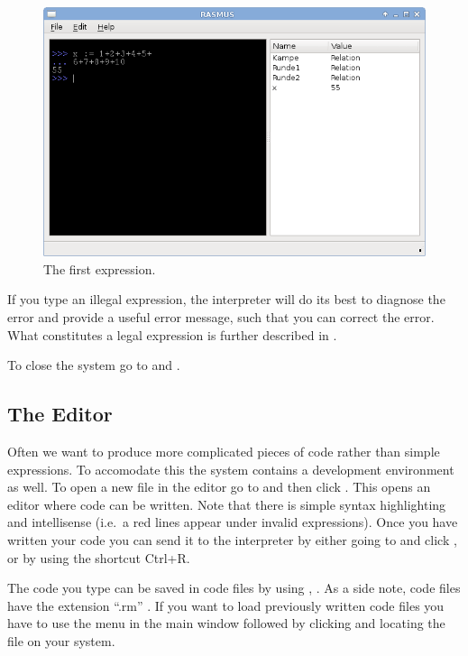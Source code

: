 \documentclass[a4,14pt,latin1]{article}
\begin{document}
\begin{figure}
  \centerline{\includegraphics[scale=0.5]{first_exp.png}}
  \caption{The first \RAS{} expression.}
  \label{fig:first_exp}
\end{figure}


If you type an illegal expression, the \RAS{} interpreter will do its
best to diagnose the error and provide a useful error message, such
that you can correct the error. What constitutes a legal expression is
further described in .

To close the \RAS{} system go to  and .

\subsection{The Editor}

Often we want to produce more complicated pieces of code rather than
simple expressions. To accomodate this the \RAS{} system contains a
development environment as well. To open a new file in the editor go
to  and then click . This opens an editor where
\RAS{} code can be written. Note that there is simple syntax
highlighting and intellisense (i.e.\ a red lines appear under invalid
expressions). Once you have written your code you can send it to the
interpreter by either going to  and click , or by
using the shortcut Ctrl+R.

The code you type can be saved in \RAS{} code files by using
, . As a side note, \RAS{} code files have the
extension ``.rm'' . If you want to load previously written \RAS{} code
files you have to use the  menu in the main window followed
by clicking  and locating the file on your system.
\end{document}
